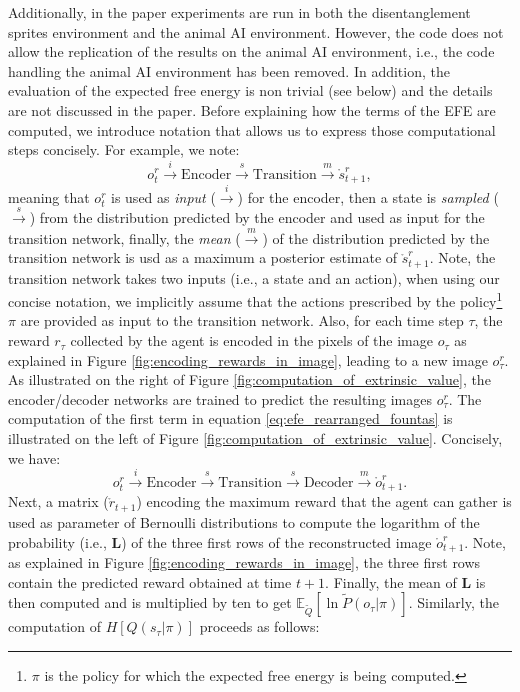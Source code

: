 \documentclass[twoside,11pt]{article}
\begin{document}
Additionally, in the paper experiments are run in both the disentanglement sprites environment and the animal AI environment. However, the code does not allow the replication of the results on the animal AI environment, i.e., the code handling the animal AI environment has been removed. In addition, the evaluation of the expected free energy is non trivial (see below) and the details are not discussed in the paper. Before explaining how the terms of the EFE are computed, we introduce notation that allows us to express those computational steps concisely. For example, we note: 
$$o^r_t \overset{i}{\rightarrow} \text{Encoder} \overset{s}{\rightarrow} \text{Transition} \overset{m}{\rightarrow} \mathring{s}^r_{t+1},$$
meaning that $o^r_t$ is used as \textit{input} ($\overset{i}{\rightarrow}$) for the encoder, then a state is \textit{sampled} ($\overset{s}{\rightarrow}$) from the distribution predicted by the encoder and used as input for the transition network, finally, the \textit{mean} ($\overset{m}{\rightarrow}$) of the distribution predicted by the transition network is usd as a maximum a posterior estimate of $\mathring{s}^r_{t+1}$. Note, the transition network takes two inputs (i.e., a state and an action), when using our concise notation, we implicitly assume that the actions prescribed by the policy\footnote{$\pi$ is the policy for which the expected free energy is being computed.} $\pi$ are provided as input to the transition network. Also, for each time step $\tau$, the reward $r_\tau$ collected by the agent is encoded in the pixels of the image $o_\tau$ as explained in Figure \ref{fig:encoding_rewards_in_image}, leading to a new image $o_\tau^r$. As illustrated on the right of Figure \ref{fig:computation_of_extrinsic_value}, the encoder/decoder networks are trained to predict the resulting images $o_\tau^r$. The computation of the first term in equation \eqref{eq:efe_rearranged_fountas} is illustrated on the left of Figure \ref{fig:computation_of_extrinsic_value}. Concisely, we have:
$$o_t^r \overset{i}{\rightarrow} \text{Encoder} \overset{s}{\rightarrow} \text{Transition} \overset{s}{\rightarrow} \text{Decoder} \overset{m}{\rightarrow} \mathring{o}_{t+1}^r.$$
Next, a matrix ($\mathring{r}_{t+1}$) encoding the maximum reward that the agent can gather is used as parameter of Bernoulli distributions to compute the logarithm of the probability (i.e., $\bm{L}$) of the three first rows of the reconstructed image $\mathring{o}_{t+1}^r$. Note, as explained in Figure \ref{fig:encoding_rewards_in_image}, the three first rows contain the predicted reward obtained at time $t+1$. Finally, the mean of $\bm{L}$ is then computed and is multiplied by ten to get $\mathbb{E}_{\tilde{Q}}[\ln \tilde{P}(o_\tau|\pi)]$. Similarly, the computation of $H[Q(s_\tau|\pi)]$ proceeds as follows:
\end{document}
